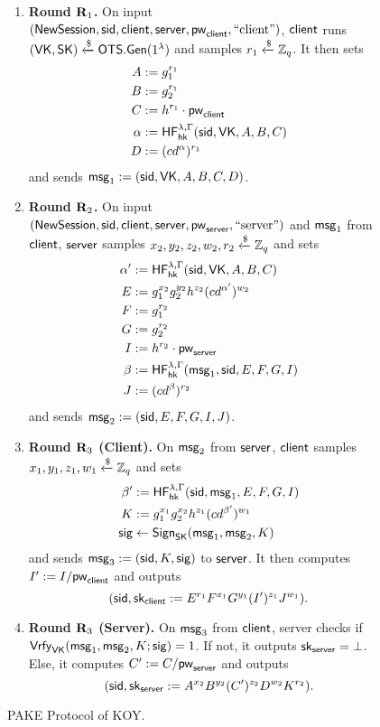 \begin{figure}[tbp]
\begin{framed}
		\begin{enumerate}
			\item \textbf{Round $\mathbf{R}_1$.} On input $(\mathsf{NewSession},\mathsf{sid},\mathsf{client},\mathsf{server},\mathsf{pw}_{\mathsf{client}},\text{``client''})$, $\mathsf{client}$ runs $(\mathsf{VK},\mathsf{SK})\xleftarrow{\$}\mathsf{OTS}.\mathsf{Gen}(1^\lambda)$ and samples $r_1\xleftarrow{\$}\mathbb{Z}_q$. It then sets
			\begin{align*}
				A &:= g_1^{r_1} \\B &:= g_2^{r_1}\\ C &:= h^{r_1}\cdot\mathsf{pw}_{\mathsf{client}}  \\ \alpha &:= \mathsf{HF}_{\mathsf{hk}}^{\lambda,\Gamma}(\mathsf{sid},\mathsf{VK},A,B,C) \\ D &:= (cd^{\alpha})^{r_1}
			\end{align*}
			and sends $\mathsf{msg}_{1} := (\mathsf{sid},\mathsf{VK},A,B,C,D)$.
			\item \textbf{Round $\mathbf{R}_2$.} On input $(\mathsf{NewSession},\mathsf{sid},\mathsf{client},\mathsf{server},\mathsf{pw}_{\mathsf{server}},\text{``server''})$ and $\mathsf{msg}_{1}$ from $\mathsf{client}$, $\mathsf{server}$ samples $x_2,y_2,z_2,w_2,r_2\xleftarrow{\$}\mathbb{Z}_q$ and sets
			\begin{align*}
				\alpha' &:= \mathsf{HF}_{\mathsf{hk}}^{\lambda,\Gamma}(\mathsf{sid},\mathsf{VK},A,B,C)\\
				E &:= g_1^{x_2}g_2^{y_2}h^{z_2}(cd^{\alpha'})^{w_2}\\
				F &:= g_1^{r_2}\\
				G &:= g_2^{r_2}\\
				I &:= h^{r_2}\cdot\mathsf{pw}_{\mathsf{server}}\\
				\beta &:= \mathsf{HF}_{\mathsf{hk}}^{\lambda,\Gamma}(\mathsf{msg}_{1},\mathsf{sid},E,F,G,I)\\
				J &:= (cd^{\beta})^{r_2}
			\end{align*}
			and sends $\mathsf{msg}_{2}:=(\mathsf{sid},E,F,G,I,J)$.
			\item \textbf{Round $\mathbf{R}_3$ (Client).} On $\mathsf{msg}_{2}$ from $\mathsf{server}$, $\mathsf{client}$ samples $x_1,y_1,z_1,w_1\xleftarrow{\$}\mathbb{Z}_q$ and sets
			\begin{align*}
			 \beta' &:= \mathsf{HF}_{\mathsf{hk}}^{\lambda,\Gamma}(\mathsf{sid},\mathsf{msg}_{1},E,F,G,I)\\
			 K &:= g_1^{x_1}g_2^{x_2}h^{z_1}(cd^{\beta'})^{w_1}\\
			 \mathsf{sig} &\gets\mathsf{Sign}_{\mathsf{SK}}(\mathsf{msg}_{1},\mathsf{msg}_{2},K)
			\end{align*}
			and sends $\mathsf{msg}_{3} := (\mathsf{sid}, K,\mathsf{sig})$ to $\mathsf{server}$. It then computes $I' := I/\mathsf{pw}_{\mathsf{client}}$ and outputs $$(\mathsf{sid},\mathsf{sk}_{\mathsf{client}} := E^{r_1}F^{x_1}G^{y_1}(I')^{z_1}J^{w_1}).$$
			\item \textbf{Round $\mathbf{R}_3$ (Server).} On $\mathsf{msg}_{3}$ from $\mathsf{client}$, server checks if $\mathsf{Vrfy}_{\mathsf{VK}}(\mathsf{msg}_{1},\mathsf{msg}_{2},K;\mathsf{sig})=1$. If not, it outputs $\mathsf{sk}_{\mathsf{server}}=\bot$. Else, it computes $C':=C/\mathsf{pw}_{\mathsf{server}}$ and outputs 
			$$(\mathsf{sid},\mathsf{sk}_{\mathsf{server}} := A^{x_2}B^{y_2}(C')^{z_2}D^{w_2}K^{r_2}).$$
		\end{enumerate}
		
	\end{framed}
	\caption{PAKE Protocol of KOY.}
	\label{fig:koy}
\end{figure}


